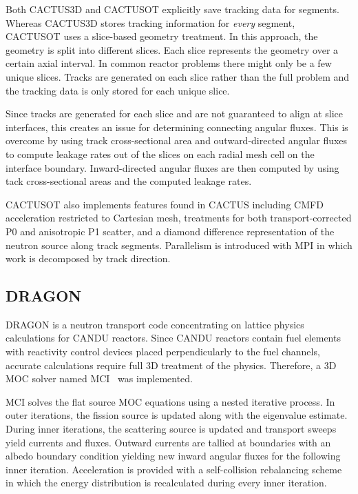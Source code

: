 Both CACTUS3D and CACTUSOT explicitly save tracking data for segments. Whereas CACTUS3D stores tracking information for \textit{every} segment, CACTUSOT uses a slice-based geometry treatment. In this approach, the geometry is split into different slices. Each slice represents the geometry over a certain axial interval. In common reactor problems there might only be a few unique slices. Tracks are generated on each slice rather than the full problem and the tracking data is only stored for each unique slice. 

Since tracks are generated for each slice and are not guaranteed to align at slice interfaces, this creates an issue for determining connecting angular fluxes. This is overcome by using track cross-sectional area and outward-directed angular fluxes to compute leakage rates out of the slices on each radial mesh cell on the interface boundary. Inward-directed angular fluxes are then computed by using tack cross-sectional areas and the computed leakage rates.

CACTUSOT also implements features found in CACTUS including \ac{CMFD} acceleration restricted to Cartesian mesh, treatments for both transport-corrected P0 and anisotropic P1 scatter, and a diamond difference representation of the neutron source along track segments. Parallelism is introduced with \ac{MPI} in which work is decomposed by track direction.

\subsection{DRAGON}
\label{sec:dragon}
DRAGON is a neutron transport code concentrating on lattice physics calculations for CANDU reactors. Since CANDU reactors contain fuel elements with reactivity control devices placed perpendicularly to the fuel channels, accurate calculations require full 3D treatment of the physics. Therefore, a 3D \ac{MOC} solver named MCI~\cite{dragon_3d_moc} was implemented. 

MCI solves the flat source \ac{MOC} equations using a nested iterative process. In outer iterations, the fission source is updated along with the eigenvalue estimate. During inner iterations, the scattering source is updated and transport sweeps yield currents and fluxes. Outward currents are tallied at boundaries with an albedo boundary condition yielding new inward angular fluxes for the following inner iteration. Acceleration is provided with a self-collision rebalancing scheme in which the energy distribution is recalculated during every inner iteration.

